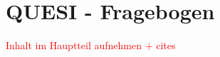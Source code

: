\section{QUESI - Fragebogen}
\textcolor{red}{Inhalt im Hauptteil aufnehmen + cites} \cite{quesi-benchmarks, quesi-short}

